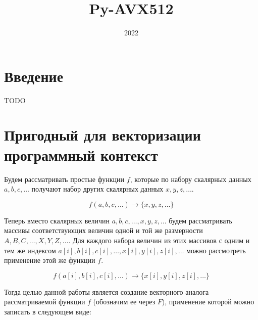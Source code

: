 \documentclass[a4paper,12pt]{extarticle}                     %
\numberwithin{equation}{section}                             %
\numberwithin{figure}{section}                               %
\numberwithin{table}{section}                                %
\theoremstyle{plain}                                         %
\numberwithin{theorem}{section}                              %
\numberwithin{lemma}{section}                                %
\numberwithin{definition}{section}                           %
\begin{document}
\title{Py-AVX512}
\date{2022}
\maketitle
\thispagestyle{empty}                                        %

\newpage

\renewcommand{\contentsname}{Оглавление}                     %
\tableofcontents

\newpage

\section*{Введение}                                          %

TODO

\newpage

\section{Пригодный для векторизации программный контекст}

Будем рассматривать простые функции $f$, которые по набору скалярных данных $a, b, c, \dots$ получают набор других скалярных данных $x, y, z, \dots$.

\begin{equation}
f(a, b, c, \dots) \rightarrow \{ x, y, z, \dots \}
\end{equation}

Теперь вместо скалярных величин $a, b, c, \dots, x, y, z, \dots$ будем рассматривать массивы соответствующих величин одной и той же размерности $A, B, C, \dots, X, Y, Z, \dots$. Для каждого набора величин из этих массивов с одним и тем же индексом $a[i], b[i], c[i], \dots, x[i], y[i], z[i], \dots$ можно рассмотреть применение этой же функции $f$.

\begin{equation}
f(a[i], b[i], c[i], \dots) \rightarrow \{ x[i], y[i], z[i], \dots \}
\end{equation}

Тогда целью данной работы является создание векторного аналога рассматриваемой функции $f$ (обозначим ее через $F$), применение которой можно записать в следующем виде:
\end{document}
